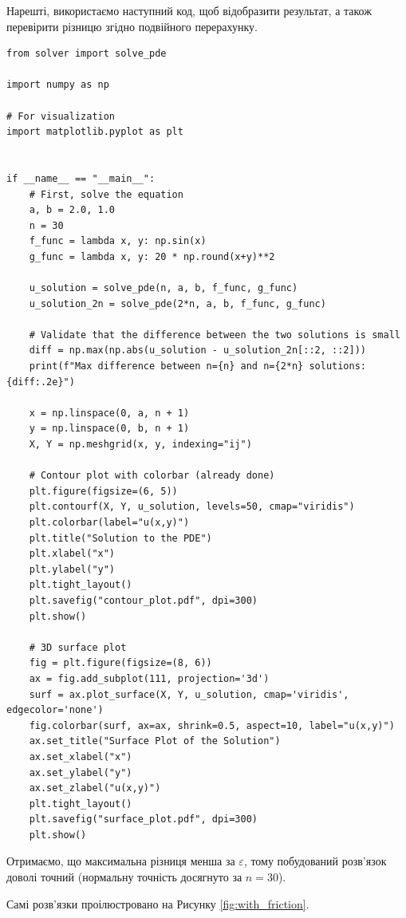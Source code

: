 \documentclass[14pt]{extarticle}
\begin{document}
Нарешті, використаємо наступний код, щоб відобразити результат, а також перевірити різницю згідно подвійного перерахунку.

\begin{verbatim}
from solver import solve_pde

import numpy as np

# For visualization
import matplotlib.pyplot as plt


if __name__ == "__main__":
    # First, solve the equation
    a, b = 2.0, 1.0
    n = 30
    f_func = lambda x, y: np.sin(x)
    g_func = lambda x, y: 20 * np.round(x+y)**2
    
    u_solution = solve_pde(n, a, b, f_func, g_func)
    u_solution_2n = solve_pde(2*n, a, b, f_func, g_func)
    
    # Validate that the difference between the two solutions is small
    diff = np.max(np.abs(u_solution - u_solution_2n[::2, ::2]))
    print(f"Max difference between n={n} and n={2*n} solutions: {diff:.2e}")

    x = np.linspace(0, a, n + 1)
    y = np.linspace(0, b, n + 1)
    X, Y = np.meshgrid(x, y, indexing="ij")
    
    # Contour plot with colorbar (already done)
    plt.figure(figsize=(6, 5))
    plt.contourf(X, Y, u_solution, levels=50, cmap="viridis")
    plt.colorbar(label="u(x,y)")
    plt.title("Solution to the PDE")
    plt.xlabel("x")
    plt.ylabel("y")
    plt.tight_layout()
    plt.savefig("contour_plot.pdf", dpi=300)
    plt.show()
    
    # 3D surface plot
    fig = plt.figure(figsize=(8, 6))
    ax = fig.add_subplot(111, projection='3d')
    surf = ax.plot_surface(X, Y, u_solution, cmap='viridis', edgecolor='none')
    fig.colorbar(surf, ax=ax, shrink=0.5, aspect=10, label="u(x,y)")
    ax.set_title("Surface Plot of the Solution")
    ax.set_xlabel("x")
    ax.set_ylabel("y")
    ax.set_zlabel("u(x,y)")
    plt.tight_layout()
    plt.savefig("surface_plot.pdf", dpi=300)
    plt.show()
\end{verbatim}

Отримаємо, що максимальна різниця менша за $\varepsilon$, тому побудований розв'язок доволі точний (нормальну точність досягнуто за $n=30$). 

Самі розв'язки проілюстровано на Рисунку \ref{fig:with_friction}.
\end{document}

